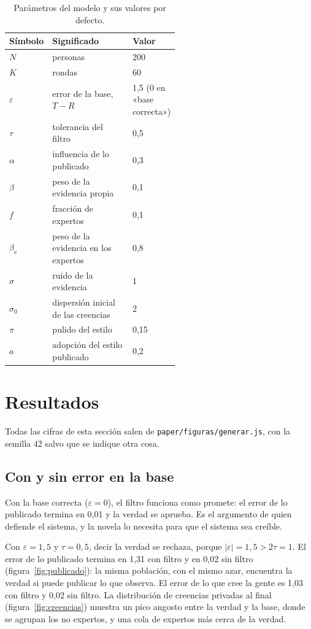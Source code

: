 \documentclass[11pt,a4paper]{article}
\begin{document}
\begin{table}[htbp]
\centering
\small
\caption{Parámetros del modelo y sus valores por defecto.}
\label{tab:parametros}
\begin{tabular}{@{}lp{0.55\linewidth}l@{}}
\toprule
Símbolo & Significado & Valor \\
\midrule
$N$ & personas & 200 \\
$K$ & rondas & 60 \\
$\varepsilon$ & error de la base, $T - R$ & 1,5 (0 en «base correcta») \\
$\tau$ & tolerancia del filtro & 0,5 \\
$\alpha$ & influencia de lo publicado & 0,3 \\
$\beta$ & peso de la evidencia propia & 0,1 \\
$f$ & fracción de expertos & 0,1 \\
$\beta_{\mathrm{e}}$ & peso de la evidencia en los expertos & 0,8 \\
$\sigma$ & ruido de la evidencia & 1 \\
$\sigma_0$ & dispersión inicial de las creencias & 2 \\
$\pi$ & pulido del estilo & 0,15 \\
$a$ & adopción del estilo publicado & 0,2 \\
\bottomrule
\end{tabular}
\end{table}

\section{Resultados}\label{sec:resultados}

Todas las cifras de esta sección salen de \texttt{paper/figuras/generar.js}, con la semilla 42 salvo que se indique otra cosa.

\subsection{Con y sin error en la base}

Con la base correcta ($\varepsilon = 0$), el filtro funciona como promete: el error de lo publicado termina en 0,01 y la verdad se aprueba. Es el argumento de quien defiende el sistema, y la novela lo necesita para que el sistema sea creíble.

Con $\varepsilon = 1{,}5$ y $\tau = 0{,}5$, decir la verdad se rechaza, porque $|\varepsilon| = 1{,}5 > 2\tau = 1$. El error de lo publicado termina en 1,31 con filtro y en 0,02 sin filtro (figura~\ref{fig:publicado}): la misma población, con el mismo azar, encuentra la verdad si puede publicar lo que observa. El error de lo que cree la gente es 1,03 con filtro y 0,02 sin filtro. La distribución de creencias privadas al final (figura~\ref{fig:creencias}) muestra un pico angosto entre la verdad y la base, donde se agrupan los no expertos, y una cola de expertos más cerca de la verdad.
\end{document}
